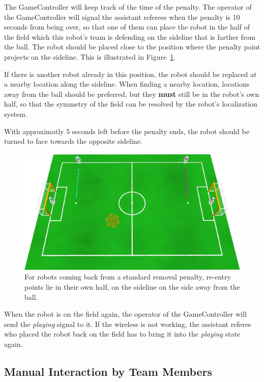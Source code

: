 \documentclass[12pt]{article}
\begin{document}
The GameController will keep track of the time of the penalty. The operator of the GameController will signal the assistant referees when the penalty is 10 seconds from being over, so that one of them can place the robot in the half of the field which this robot's team is defending on the sideline that is farther from the ball. The robot should be placed close to the position where the penalty point projects on the sideline. This is illustrated in Figure~\ref{fig:penalty_re-entry_points}. 

If there is another robot already in this position, the robot should be replaced at a nearby location along the sideline. When finding a nearby location, locations away from the ball should be preferred, but they \textbf{must} still be in the robot's own half, so that the symmetry of the field can be resolved by the robot's localization system.

With approximatly 5 seconds left before the penalty ends, the robot should be turned to face towards the opposite sideline.

\begin{figure}[t]
\centerline{\includegraphics[width=\columnwidth]{figs/penalty_re-entry_points.pdf}}
\caption{For robots coming back from a standard removal penalty, re-entry points lie in their own half, on the sideline on the side away from the ball.}
\label{fig:penalty_re-entry_points}
\end{figure}

When the robot is on the field again, the operator of the GameController will send the \emph{playing} signal to it. If the wireless is not working, the assistant referee who placed the robot back on the field has to bring it into the \emph{playing} state again.

\subsection{Manual Interaction by Team Members}
\end{document}

